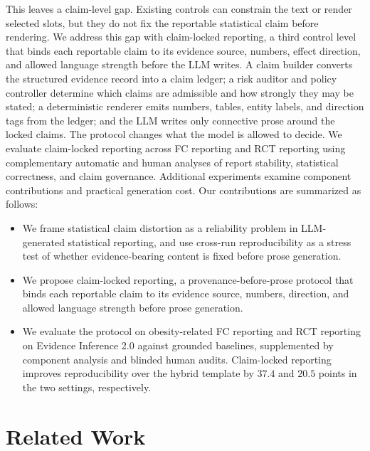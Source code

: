 \documentclass[10pt,twocolumn]{article}
\begin{document}
This leaves a claim-level gap. Existing controls can constrain the text or render selected slots, but they do not fix the reportable statistical claim before rendering. We address this gap with claim-locked reporting, a third control level that binds each reportable claim to its evidence source, numbers, effect direction, and allowed language strength before the LLM writes. A claim builder converts the structured evidence record into a claim ledger; a risk auditor and policy controller determine which claims are admissible and how strongly they may be stated; a deterministic renderer emits numbers, tables, entity labels, and direction tags from the ledger; and the LLM writes only connective prose around the locked claims. The protocol changes what the model is allowed to decide.
We evaluate claim-locked reporting across FC reporting and RCT reporting using complementary automatic and human analyses of report stability, statistical correctness, and claim governance. Additional experiments examine component contributions and practical generation cost.
Our contributions are summarized as follows:

\begin{itemize}
	\item We frame statistical claim distortion as a reliability problem in LLM-generated statistical reporting, and use cross-run reproducibility as a stress test of whether evidence-bearing content is fixed before prose generation.
	
	\item We propose claim-locked reporting, a provenance-before-prose protocol that binds each reportable claim to its evidence source, numbers, direction, and allowed language strength before prose generation.
	
	\item We evaluate the protocol on obesity-related FC reporting and RCT reporting on Evidence Inference 2.0 against grounded baselines, supplemented by component analysis and blinded human audits. Claim-locked reporting improves reproducibility over the hybrid template by $37.4$ and $20.5$ points in the two settings, respectively.
\end{itemize}

\section{Related Work}
\end{document}
